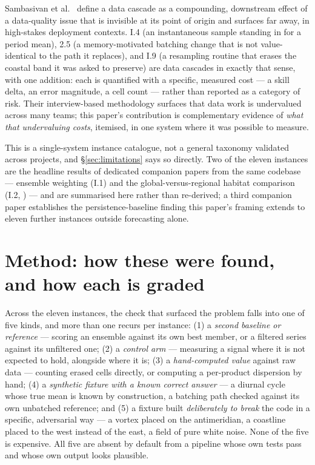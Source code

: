  Sambasivan et al.~\citep{sambasivan2021} define a data
cascade as a compounding, downstream effect of a data-quality issue that is
invisible at its point of origin and surfaces far away, in high-stakes
deployment contexts. I.4 (an instantaneous sample standing in for a period
mean), 2.5 (a memory-motivated batching change that is not value-identical
to the path it replaces), and I.9 (a resampling routine that erases the
coastal band it was asked to preserve) are data cascades in exactly that
sense, with one addition: each is quantified with a specific, measured cost
--- a skill delta, an error magnitude, a cell count --- rather than reported
as a category of risk. Their interview-based methodology surfaces that data
work is undervalued across many teams; this paper's contribution is
complementary evidence of \emph{what that undervaluing costs}, itemised, in
one system where it was possible to measure.

 This is a single-system instance catalogue, not a general
taxonomy validated across projects, and \S\ref{sec:limitations} says so
directly. Two of the eleven instances are the headline results of dedicated
companion papers from the same codebase --- ensemble weighting (I.1) and the
global-versus-regional habitat comparison (I.2, \citep{moredata2026}) --- and
are summarised here rather than re-derived; a third companion paper
\citep{risingskill2026} establishes the persistence-baseline finding this
paper's framing extends to eleven further instances outside forecasting
alone.

\section{Method: how these were found, and how each is graded}
\label{sec:method}

 Across the eleven instances, the check that surfaced
the problem falls into one of five kinds, and more than one recurs per
instance: (1) a \emph{second baseline or reference} --- scoring an ensemble
against its own best member, or a filtered series against its unfiltered
one; (2) a \emph{control arm} --- measuring a signal where it is not
expected to hold, alongside where it is; (3) a \emph{hand-computed value}
against raw data --- counting erased cells directly, or computing a
per-product dispersion by hand; (4) a \emph{synthetic fixture with a known
correct answer} --- a diurnal cycle whose true mean is known by construction,
a batching path checked against its own unbatched reference; and (5) a
fixture built \emph{deliberately to break} the code in a specific,
adversarial way --- a vortex placed on the antimeridian, a coastline placed
to the west instead of the east, a field of pure white noise. None of the
five is expensive. All five are absent by default from a pipeline whose own
tests pass and whose own output looks plausible.


